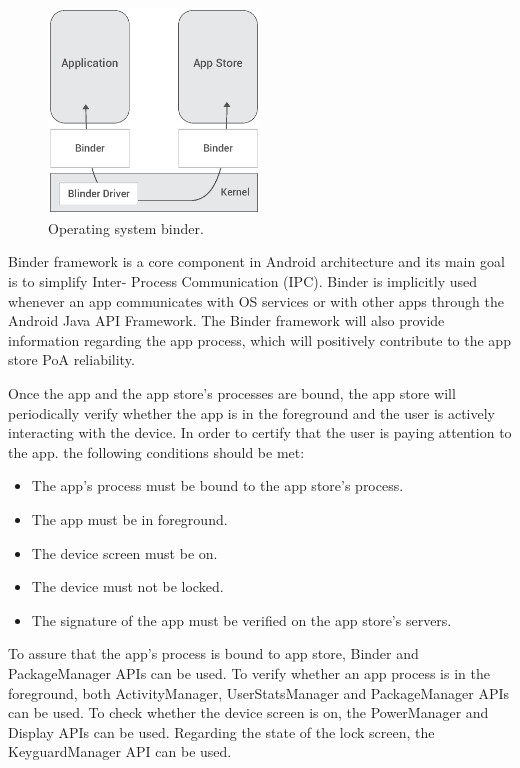 \begin{figure}[!ht]
\centering
\includegraphics[width=0.5\textwidth]{diagrams/binder_diagram.eps}
\caption{Operating system binder.}
\label{fig:binder}
\end{figure}

Binder framework is a core component in Android architecture and its main goal is to simplify Inter-
Process Communication (IPC). Binder is implicitly used whenever an app communicates with OS 
services or with other apps through the Android Java API Framework. The Binder framework will also 
provide information regarding the app process, which will positively contribute to the app store 
\textsf{PoA} reliability.

Once the app and the app store's processes are bound, the app store will periodically verify whether 
the app is in the foreground and the user is actively interacting with the device. In order to certify that 
the user is paying attention to the app. the following conditions should be met:

\begin{itemize}
\item The app's process must be bound to the app store's process.
\item The app must be in foreground.
\item The device screen must be on.
\item The device must not be locked. 
\item The signature of the app must be verified on the app store's servers.
\end{itemize}

To assure that the app's process is bound to app store, Binder and PackageManager APIs can be used. 
To verify whether an app process is in the foreground, both ActivityManager, UserStatsManager and 
 PackageManager APIs can be used. To check whether the device screen is on, the PowerManager 
and Display APIs can be used. Regarding the state of the lock screen, the KeyguardManager API can 
be used. 

